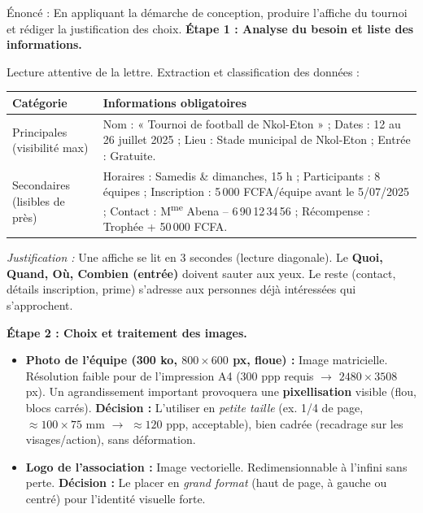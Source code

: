 \documentclass[11pt]{article}
\newcommand{\cle}[1]{{\popxbold\color{popdark}#1}}
\begin{document}
\begin{exoresolu}
Énoncé : En appliquant la démarche de conception, produire l'affiche du tournoi et rédiger la justification des choix.
\tcblower
\textbf{Étape 1 : Analyse du besoin et liste des informations.}

Lecture attentive de la lettre. Extraction et classification des données :

\begin{center}
\begin{tabularx}{\linewidth}{|l|X|}
\hline
\rowcolor{popblueL} \textbf{Catégorie} & \textbf{Informations obligatoires} \\
\hline
Principales (visibilité max) & Nom : « Tournoi de football de Nkol-Eton » ; Dates : 12 au 26 juillet 2025 ; Lieu : Stade municipal de Nkol-Eton ; Entrée : Gratuite. \\
\hline
Secondaires (lisibles de près) & Horaires : Samedis \& dimanches, 15 h ; Participants : 8 équipes ; Inscription : 5\,000 FCFA/équipe avant le 5/07/2025 ; Contact : M\textsuperscript{me} Abena -- 6\,90\,12\,34\,56 ; Récompense : Trophée + 50\,000 FCFA. \\
\hline
\end{tabularx}
\end{center}

\emph{Justification :} Une affiche se lit en 3 secondes (lecture diagonale). Le \textbf{Quoi, Quand, Où, Combien (entrée)} doivent sauter aux yeux. Le reste (contact, détails inscription, prime) s'adresse aux personnes déjà intéressées qui s'approchent.

\textbf{Étape 2 : Choix et traitement des images.}

\begin{itemize}
\item \textbf{Photo de l'équipe (300 ko, $800 \times 600$ px, floue) :} Image \cle{matricielle}. Résolution faible pour de l'impression A4 (300 ppp requis $\rightarrow$ $2480 \times 3508$ px). Un agrandissement important provoquera une \textbf{pixellisation} visible (flou, blocs carrés). \textbf{Décision :} L'utiliser en \emph{petite taille} (ex. 1/4 de page, $\approx 100 \times 75$ mm $\rightarrow$ $\approx 120$ ppp, acceptable), bien cadrée (recadrage sur les visages/action), sans déformation.
\item \textbf{Logo de l'association :} Image \cle{vectorielle}. Redimensionnable à l'infini sans perte. \textbf{Décision :} Le placer en \emph{grand format} (haut de page, à gauche ou centré) pour l'identité visuelle forte.
\end{itemize}


\end{exoresolu}
\end{document}
